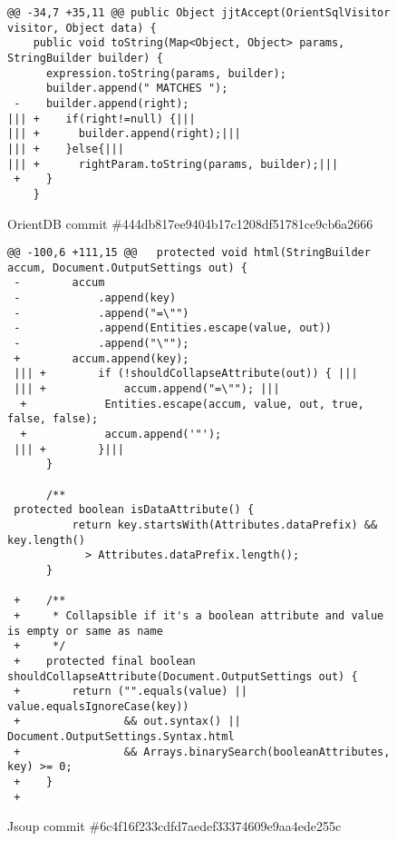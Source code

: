 \lstset{language=Java}

\begin{figure*}
\begin{lstlisting}[moredelim={[is][\color{red}]{|||}{|||}}]
@@ -34,7 +35,11 @@ public Object jjtAccept(OrientSqlVisitor visitor, Object data) {
    public void toString(Map<Object, Object> params, StringBuilder builder) {
      expression.toString(params, builder);
      builder.append(" MATCHES ");
 -    builder.append(right);
||| +    if(right!=null) {|||  
||| +      builder.append(right);|||
||| +    }else{|||
||| +      rightParam.toString(params, builder);|||
 +    }
    }
\end{lstlisting}
\caption{OrientDB commit \#444db817ee9404b17c1208df51781ce9cb6a2666\label{fig:orient}}
\end{figure*}

\begin{figure*}
\begin{lstlisting}[moredelim={[is][\color{red}]{|||}{|||}}]
 @@ -100,6 +111,15 @@   protected void html(StringBuilder accum, Document.OutputSettings out) {
 -        accum
 -            .append(key)
 -            .append("=\"")
 -            .append(Entities.escape(value, out))
 -            .append("\"");
 +        accum.append(key);
 ||| +        if (!shouldCollapseAttribute(out)) { |||
 ||| +            accum.append("=\""); |||
  +            Entities.escape(accum, value, out, true, false, false);
  +            accum.append('"');
 ||| +        }|||
      }
  
      /**
 protected boolean isDataAttribute() {
          return key.startsWith(Attributes.dataPrefix) && key.length() 
            > Attributes.dataPrefix.length();
      }
  
 +    /**
 +     * Collapsible if it's a boolean attribute and value is empty or same as name
 +     */
 +    protected final boolean shouldCollapseAttribute(Document.OutputSettings out) {
 +        return ("".equals(value) || value.equalsIgnoreCase(key))
 +                && out.syntax() || Document.OutputSettings.Syntax.html
 +                && Arrays.binarySearch(booleanAttributes, key) >= 0;
 +    }
 +
 \end{lstlisting}
\caption{Jsoup commit \#6c4f16f233cdfd7aedef33374609e9aa4ede255c\label{fig:jsoup}}
\end{figure*}